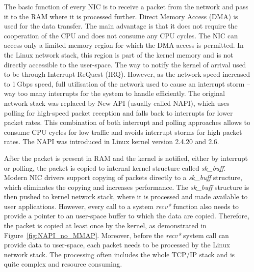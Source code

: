 The basic function of every NIC is to receive a packet from the network and pass it to the RAM where it is processed further. Direct Memory Access (DMA) is used for the data transfer. The main advantage is that it does not require the cooperation of the CPU and does not consume any CPU cycles. The NIC can access only a limited memory region for which the DMA access is permitted. In the Linux network stack, this region is part of the kernel memory and is not directly accessible to the user-space. The way to notify the kernel of arrival used to be through Interrupt ReQuest (IRQ). However, as the network speed increased to 1\,Gbps speed, full utilisation of the network used to cause an interrupt storm -- way too many interrupts for the system to handle efficiently. The original network stack was replaced by New API (usually called NAPI), which uses polling for high-speed packet reception and falls back to interrupts for lower packet rates. This combination of both interrupt and polling approaches allows to consume CPU cycles for low traffic and avoids interrupt storms for high packet rates. The NAPI was introduced in Linux kernel version 2.4.20 and 2.6.

After the packet is present in RAM and the kernel is notified, either by interrupt or polling, the packet is copied to internal kernel structure called \emph{sk\_buff}. Modern NIC drivers support copying of packets directly to a \emph{sk\_buff} structure, which eliminates the copying and increases performance. The \emph{sk\_buff} structure is then pushed to kernel network stack, where it is processed and made available to user applications. However, every call to a system \emph{recv*} function also needs to provide a pointer to an user-space buffer to which the data are copied. Therefore, the packet is copied at least once by the kernel, as demonstrated in Figure~\ref{fig:NAPI_no_MMAP}. Moreover, before the \emph{recv*} system call can provide data to user-space, each packet needs to be processed by the Linux network stack. The processing often includes the whole TCP/IP stack and is quite complex and resource consuming.

